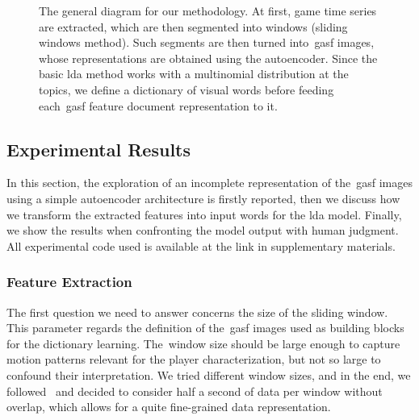 \begin{figure}[h]
	\centering
{}
\caption{The general diagram for our methodology. At first, game time series are extracted, which are then segmented into windows (sliding windows method). Such segments are then turned into~\gls{gasf} images, whose representations are obtained using the autoencoder. Since the basic \gls{lda} method works with a multinomial distribution at the topics, we define a dictionary of visual words before feeding each~\gls{gasf} feature document representation to it.}
\label{diagram:methodology}
\end{figure}

\subsection{Experimental Results}
In this section, the exploration of an incomplete representation of the~\gls{gasf} images using a simple autoencoder architecture is firstly reported, then we discuss how we transform the extracted features into input words for the \gls{lda} model. Finally, we show the results when confronting the model output with human judgment. All experimental code used is available at the link in supplementary materials. %

\subsubsection{Feature Extraction}

The first question we need to answer concerns the size of the sliding window. This parameter regards the definition of the~\gls{gasf} images used as building blocks for the dictionary learning. The~window size should be large enough to capture motion patterns relevant for the player characterization, but not so large to confound their interpretation. We tried different window sizes, and in the end, we followed~\cite{oliveira_activity_2017} and decided to consider half a second of data per window without overlap, which allows for a quite fine-grained data representation.

